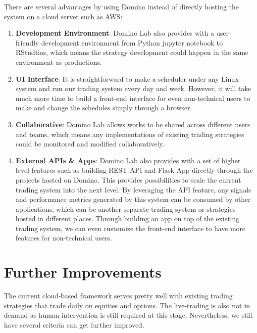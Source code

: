 \documentclass[12pt]{article}
\begin{document}
There are several advantages by using Domino instead of directly hosting the system on a cloud server such as AWS:

\begin{enumerate}
    \item \textbf{Development Environment}: Domino Lab also provides with a user-friendly development environment from Python jupyter notebook to RStudtios, which means the strategy development could happen in the same environment as productions.
    \item \textbf{UI Interface}: It is straightforward to make a scheduler under any Linux system and run our trading system every day and week. However, it will take much more time to build a front-end interface for even non-technical users to make and change the schedules simply through a browser.
    \item \textbf{Collaborative}: Domino Lab allows works to be shared across different users and teams, which means any implementations of existing trading strategies could be monitored and modified collaboratively. 
    \item \textbf{External APIs \& Apps}: Domino Lab also provides with a set of higher level features such as building REST API and Flask App directly through the projects hosted on Domino. This provides possibilities to scale the current trading system into the next level. By leveraging the API feature, any signals and performance metrics generated by this system can be consumed by other applications, which can be another separate trading system or strategies hosted in different places. Through building an app on top of the existing trading system, we can even customize the front-end interface to have more features for non-technical users.
\end{enumerate}

\section{Further Improvements}

The current cloud-based framework serves pretty well with existing trading strategies that trade daily on equities and options. The live-trading is also not in demand as human intervention is still required at this stage. Nevertheless, we still have several criteria can get further improved.
\end{document}
